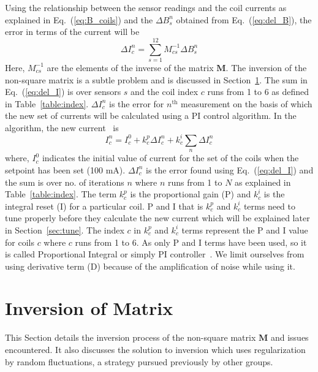 Using the relationship between the sensor readings and the coil currents as explained in Eq.~(\ref{eq:B_coils}) and the $\Delta B_s^n$ obtained from Eq.~(\ref{eq:del_B}), the error in terms of the current  will be
\begin{equation}\label{eq:del_I}
    \Delta I_c^n =\sum_{s=1}^{12} M^{-1}_{cs} \Delta B_s^n
\end{equation}
Here, $M^{-1}_{cs}$ are the elements of the inverse of the matrix $\bm{M}$. The inversion of the non-square matrix is a subtle problem and is discussed in Section~\ref{sec:inv}. The sum in Eq.~(\ref{eq:del_I}) is over sensors $s$ and the coil index $c$ runs from 1 to 6 as defined in Table~\ref{table:index}. $\Delta I_c^n$ is the error for $n^{\mathrm{th}}$ measurement on the basis of which the new set of currents will be calculated using a PI control algorithm. In the algorithm, the new current~\cite{bea} is
\begin{equation}\label{eq:I}
    I^n_c=I^0_c+k^p_c \Delta I_c^n+k^i_c\sum_n \Delta I_c^n
\end{equation}
where, $I^0_c$ indicates the initial value of current for the set of the coils when the setpoint has been set (100 mA). $\Delta I_c^n$ is the error found using Eq.~(\ref{eq:del_I}) and the sum is over no. of iterations $n$ where $n$ runs from 1 to $N$ as explained in Table~\ref{table:index}. The term $k^p_c$ is the proportional gain (P) and $k^i_c$ is the integral reset (I) for a particular coil. P and I that is $k^p_c$ and $k^i_c$ terms need to tune properly before they calculate the new current which will be explained later in Section~\ref{sec:tune}. The index $c$ in $k^p_c$ and $k^i_c$ terms represent the P and I value for coils $c$ where $c$ runs from 1 to 6. As only P and I terms have been used, so it is called Proportional Integral or simply PI controller~\cite{pid}. We limit ourselves from using derivative term (D) because of the amplification of noise while using it.


\section{Inversion of Matrix}\label{sec:inv}

This Section details the inversion process of the non-square matrix $\bm{M}$ and issues encountered. It also discusses the solution to inversion which uses regularization by random fluctuations, a strategy pursued previously by other groups. 



